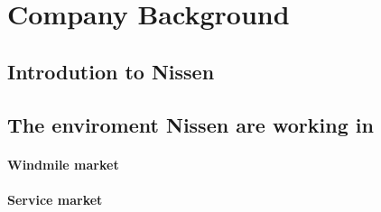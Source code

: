 \chapter{Company Background}\label{ch:company_background}


\section{Introdution to Nissen}



\section{The enviroment Nissen are working in}

\subsubsection{Windmile market}

\subsubsection{Service market}